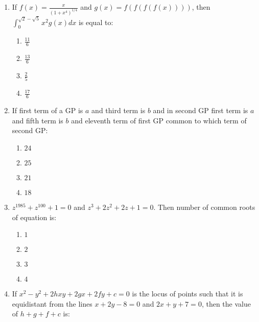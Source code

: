 \documentclass[journal]{IEEEtran}
\newcommand{\brak}[1]{\left( #1 \right)}
\begin{document}
\begin{enumerate}
    \item If $f\brak{x}=\frac{x}{\brak{1+x^4}^{1/4}}$ and $g\brak{x}=f\brak{f\brak{f\brak{f\brak{x}}}}$, then $\int_{0}^{\sqrt{2}-\sqrt{5}}x^2g\brak{x}dx$ is equal to:

        \begin{multicols}{4}
        \begin{enumerate}
        \item $\frac{11}{6}$
        \item $\frac{13}{6}$
        \item $\frac{2}{5}$
        \item $\frac{17}{6}$
        \end{enumerate}
        \end{multicols}
        
    \item If first term of a GP is $a$ and third term is $b$ and in second GP first term is $a$ and fifth term is $b$ and eleventh term of first GP common to which term of second GP:

        \begin{multicols}{4}
        \begin{enumerate}
        \item $24$
        \item $25$
        \item $21$
        \item $18$
        \end{enumerate}
        \end{multicols}

    \item $z^{1985}+z^{100}+1=0$ and $z^3+2z^2+2z+1=0$. Then number of common roots of equation is:

        \begin{multicols}{4}
        \begin{enumerate}
        \item $1$
        \item $2$
        \item $3$
        \item $4$
        \end{enumerate}
        \end{multicols}

    \item If $x^2-y^2+2hxy+2gx+2fy+c=0$ is the locus of points such that it is equidistant from the lines $x+2y-8=0$ and $2x+y+7=0$, then the value of $h+g+f+c$ is:


\end{enumerate}
\end{document}
